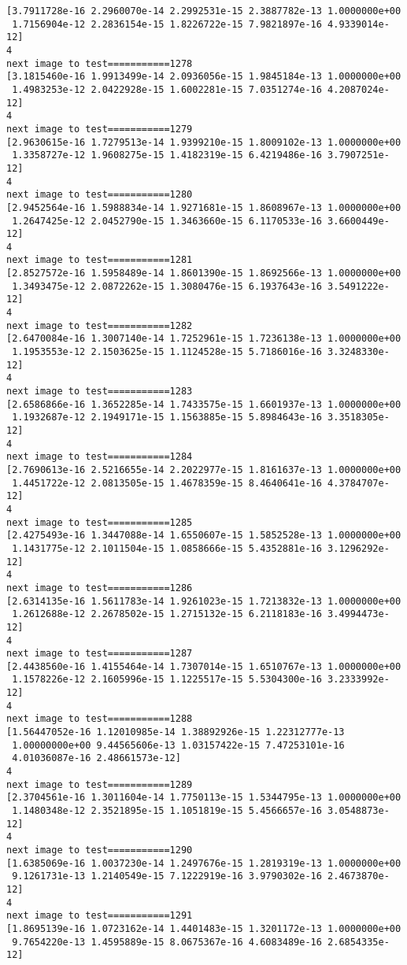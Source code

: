 \documentclass[11pt]{article}
\begin{document}
\begin{Verbatim}[commandchars=\\\{\}]
[3.7911728e-16 2.2960070e-14 2.2992531e-15 2.3887782e-13 1.0000000e+00
 1.7156904e-12 2.2836154e-15 1.8226722e-15 7.9821897e-16 4.9339014e-12]
4
next image to test===========1278
[3.1815460e-16 1.9913499e-14 2.0936056e-15 1.9845184e-13 1.0000000e+00
 1.4983253e-12 2.0422928e-15 1.6002281e-15 7.0351274e-16 4.2087024e-12]
4
next image to test===========1279
[2.9630615e-16 1.7279513e-14 1.9399210e-15 1.8009102e-13 1.0000000e+00
 1.3358727e-12 1.9608275e-15 1.4182319e-15 6.4219486e-16 3.7907251e-12]
4
next image to test===========1280
[2.9452564e-16 1.5988834e-14 1.9271681e-15 1.8608967e-13 1.0000000e+00
 1.2647425e-12 2.0452790e-15 1.3463660e-15 6.1170533e-16 3.6600449e-12]
4
next image to test===========1281
[2.8527572e-16 1.5958489e-14 1.8601390e-15 1.8692566e-13 1.0000000e+00
 1.3493475e-12 2.0872262e-15 1.3080476e-15 6.1937643e-16 3.5491222e-12]
4
next image to test===========1282
[2.6470084e-16 1.3007140e-14 1.7252961e-15 1.7236138e-13 1.0000000e+00
 1.1953553e-12 2.1503625e-15 1.1124528e-15 5.7186016e-16 3.3248330e-12]
4
next image to test===========1283
[2.6586866e-16 1.3652285e-14 1.7433575e-15 1.6601937e-13 1.0000000e+00
 1.1932687e-12 2.1949171e-15 1.1563885e-15 5.8984643e-16 3.3518305e-12]
4
next image to test===========1284
[2.7690613e-16 2.5216655e-14 2.2022977e-15 1.8161637e-13 1.0000000e+00
 1.4451722e-12 2.0813505e-15 1.4678359e-15 8.4640641e-16 4.3784707e-12]
4
next image to test===========1285
[2.4275493e-16 1.3447088e-14 1.6550607e-15 1.5852528e-13 1.0000000e+00
 1.1431775e-12 2.1011504e-15 1.0858666e-15 5.4352881e-16 3.1296292e-12]
4
next image to test===========1286
[2.6314135e-16 1.5611783e-14 1.9261023e-15 1.7213832e-13 1.0000000e+00
 1.2612688e-12 2.2678502e-15 1.2715132e-15 6.2118183e-16 3.4994473e-12]
4
next image to test===========1287
[2.4438560e-16 1.4155464e-14 1.7307014e-15 1.6510767e-13 1.0000000e+00
 1.1578226e-12 2.1605996e-15 1.1225517e-15 5.5304300e-16 3.2333992e-12]
4
next image to test===========1288
[1.56447052e-16 1.12010985e-14 1.38892926e-15 1.22312777e-13
 1.00000000e+00 9.44565606e-13 1.03157422e-15 7.47253101e-16
 4.01036087e-16 2.48661573e-12]
4
next image to test===========1289
[2.3704561e-16 1.3011604e-14 1.7750113e-15 1.5344795e-13 1.0000000e+00
 1.1480348e-12 2.3521895e-15 1.1051819e-15 5.4566657e-16 3.0548873e-12]
4
next image to test===========1290
[1.6385069e-16 1.0037230e-14 1.2497676e-15 1.2819319e-13 1.0000000e+00
 9.1261731e-13 1.2140549e-15 7.1222919e-16 3.9790302e-16 2.4673870e-12]
4
next image to test===========1291
[1.8695139e-16 1.0723162e-14 1.4401483e-15 1.3201172e-13 1.0000000e+00
 9.7654220e-13 1.4595889e-15 8.0675367e-16 4.6083489e-16 2.6854335e-12]

\end{Verbatim}
\end{document}
